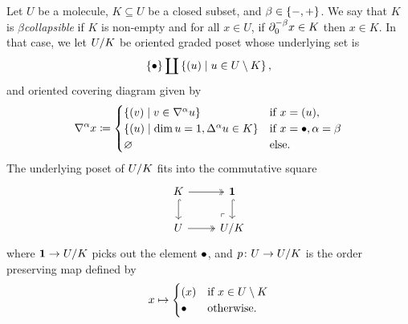 \begin{dfn} 
    Let \( U \) be a molecule, \( K \subseteq U \) be a closed subset, and \( \beta \in \set{-, +} \).
    We say that \( K \) is \emph{\( \beta \)\nbd collapsible} if \( K \) is non-empty and for all \( x \in U \), if \( \bd{0}{-\beta} x \in K \) then \( x \in K \).
    In that case, we let \( \coll K U \) be oriented graded poset whose underlying set is
    \begin{equation*}
        \set{\zcoll} \coprod \set{\icoll u \mid u \in U \setminus K},
    \end{equation*}
    and oriented covering diagram given by
    \begin{equation*}
        \cofaces{}{\a} x \eqdef
        \begin{cases}
            \set{ \icoll v \mid v \in \cofaces{}{\a} u} & \text{if } x = \icoll u,\\
            \set{ \icoll u \mid \dim u = 1, \faces{}{\a} u \in K} &\text{if } x = \bullet, \a = \beta\\
            \varnothing &\text{else.}
        \end{cases}
    \end{equation*}
    The underlying poset of \( \coll{K}{U} \) fits into the commutative square
    \begin{equation} \label{tik:square_collapse}
        \begin{tikzcd} 
            K & \pt \\
            U & {\coll K U}
            \arrow[""{name=0, anchor=center, inner sep=0}, two heads, from=1-1, to=1-2]
            \arrow[hook, from=1-1, to=2-1]
            \arrow[hook, from=1-2, to=2-2]
            \arrow[two heads, from=2-1, to=2-2]
            \arrow["\lrcorner"{anchor=center, pos=0.125, rotate=180}, draw=none, from=2-2, to=0]
        \end{tikzcd}
    \end{equation}
    where \( \pt \to \coll{K}{U} \) picks out the element \( \zcoll \), and \( \mapcoll \colon U \to \coll{K}{U} \) is the order preserving map defined by
    \begin{equation*}
        x \mapsto
        \begin{cases}
            \icoll x & \text{if } x \in U \setminus K\\
            \zcoll & \text{otherwise.}
        \end{cases}
    \end{equation*}
\end{dfn}

